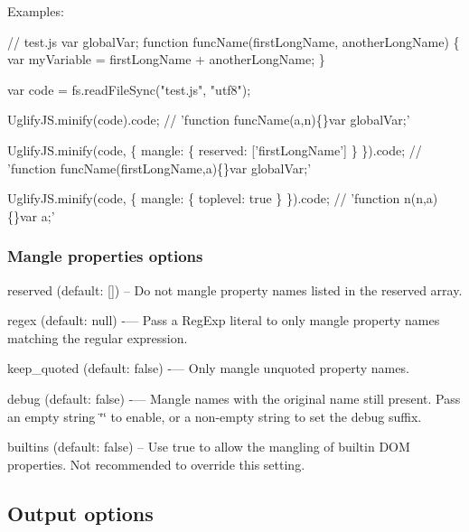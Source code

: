 Examples\+:


\begin{DoxyCode}
// test.js
var globalVar;
function funcName(firstLongName, anotherLongName) \{
    var myVariable = firstLongName +  anotherLongName;
\}
\end{DoxyCode}
 
\begin{DoxyCode}
var code = fs.readFileSync("test.js", "utf8");

UglifyJS.minify(code).code;
// 'function funcName(a,n)\{\}var globalVar;'

UglifyJS.minify(code, \{ mangle: \{ reserved: ['firstLongName'] \} \}).code;
// 'function funcName(firstLongName,a)\{\}var globalVar;'

UglifyJS.minify(code, \{ mangle: \{ toplevel: true \} \}).code;
// 'function n(n,a)\{\}var a;'
\end{DoxyCode}


\subsubsection*{Mangle properties options}


\begin{DoxyItemize}
\item {\ttfamily reserved} (default\+: {\ttfamily \mbox{[}\mbox{]}}) -- Do not mangle property names listed in the {\ttfamily reserved} array.
\item {\ttfamily regex} (default\+: {\ttfamily null}) -\/— Pass a Reg\+Exp literal to only mangle property names matching the regular expression.
\item {\ttfamily keep\+\_\+quoted} (default\+: {\ttfamily false}) -\/— Only mangle unquoted property names.
\item {\ttfamily debug} (default\+: {\ttfamily false}) -\/— Mangle names with the original name still present. Pass an empty string {\ttfamily \char`\"{}\char`\"{}} to enable, or a non-\/empty string to set the debug suffix.
\item {\ttfamily builtins} (default\+: {\ttfamily false}) -- Use {\ttfamily true} to allow the mangling of builtin D\+OM properties. Not recommended to override this setting.
\end{DoxyItemize}

\subsection*{Output options}

